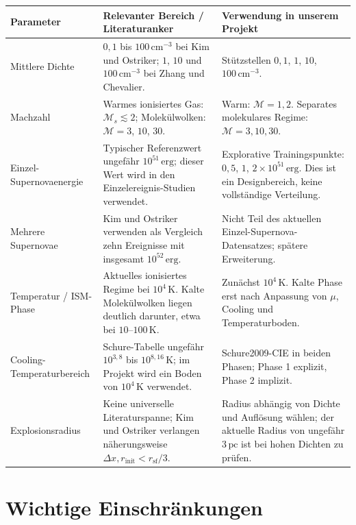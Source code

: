 \documentclass[11pt,a4paper]{article}
\begin{document}
\begin{tabularx}{\textwidth}{p{3.3cm}p{4.1cm}Y}
\toprule
Parameter & Relevanter Bereich / Literaturanker & Verwendung in unserem Projekt \\
\midrule
Mittlere Dichte & $0{,}1$ bis $100\,\mathrm{cm}^{-3}$ bei Kim und Ostriker; $1$, $10$ und $100\,\mathrm{cm}^{-3}$ bei Zhang und Chevalier. & Stützstellen $0{,}1$, $1$, $10$, $100\,\mathrm{cm}^{-3}$. \\
\addlinespace
Machzahl & Warmes ionisiertes Gas: $\mathcal M_s\lesssim2$; Molekülwolken: $\mathcal M=3$, $10$, $30$. & Warm: $\mathcal M=1,2$. Separates molekulares Regime: $\mathcal M=3,10,30$. \\
\addlinespace
Einzel-Supernovaenergie & Typischer Referenzwert ungefähr $10^{51}\,\mathrm{erg}$; dieser Wert wird in den Einzelereignis-Studien verwendet. & Explorative Trainingspunkte: $0{,}5$, $1$, $2\times10^{51}\,\mathrm{erg}$. Dies ist ein Designbereich, keine vollständige Verteilung. \\
\addlinespace
Mehrere Supernovae & Kim und Ostriker verwenden als Vergleich zehn Ereignisse mit insgesamt $10^{52}\,\mathrm{erg}$. & Nicht Teil des aktuellen Einzel-Supernova-Datensatzes; spätere Erweiterung. \\
\addlinespace
Temperatur / ISM-Phase & Aktuelles ionisiertes Regime bei $10^4\,\mathrm K$. Kalte Molekülwolken liegen deutlich darunter, etwa bei $10$--$100\,\mathrm K$. & Zunächst $10^4\,\mathrm K$. Kalte Phase erst nach Anpassung von $\mu$, Cooling und Temperaturboden. \\
\addlinespace
Cooling-Temperaturbereich & Schure-Tabelle ungefähr $10^{3{,}8}$ bis $10^{8{,}16}\,\mathrm K$; im Projekt wird ein Boden von $10^4\,\mathrm K$ verwendet. & Schure2009-CIE in beiden Phasen; Phase 1 explizit, Phase 2 implizit. \\
\addlinespace
Explosionsradius & Keine universelle Literaturspanne; Kim und Ostriker verlangen näherungsweise $\Delta x,r_{\mathrm{init}}<r_{\mathrm{sf}}/3$. & Radius abhängig von Dichte und Auflösung wählen; der aktuelle Radius von ungefähr $3\,\mathrm{pc}$ ist bei hohen Dichten zu prüfen. \\
\bottomrule
\end{tabularx}

\section{Wichtige Einschränkungen}
\end{document}
